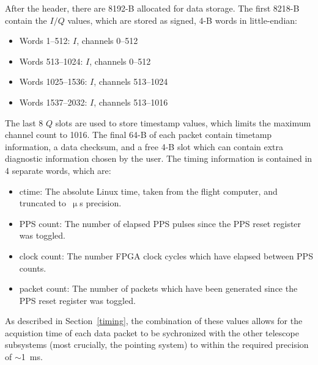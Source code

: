 After the header, there are 8192-B allocated for data storage. The first 8218-B contain the $I/Q$ values, which are stored as signed, 4-B words in little-endian:

\begin{itemize}[nosep]
  \item Words 1--512: $I$, channels 0--512
  \item Words 513--1024: $I$, channels 0--512
  \item Words 1025--1536: $I$, channels 513--1024
  \item Words 1537--2032: $I$, channels 513--1016
\end{itemize}

\vspace{5mm}

The last 8 $Q$ slots are used to store timestamp values, which limits the maximum channel count to 1016. The final 64-B of each packet contain timetamp information, a data checksum, and a free 4-B slot which can contain extra diagnostic information chosen by the user. The timing information is contained in 4 separate words, which are:

\begin{itemize}[nosep]
  \item ctime: The absolute Linux time, taken from the flight computer, and truncated to~$\upmu$s precision.
  \item PPS count: The number of elapsed PPS pulses since the PPS reset register was toggled.
  \item clock count: The number FPGA clock cycles which have elapsed between PPS counts.
  \item packet count: The number of packets which have been generated since the PPS reset register was toggled.
\end{itemize}

\vspace{5mm}

As described in Section~\ref{timing}, the combination of these values allows for the acquistion time of each data packet to be sychronized with the other telescope subsystems (most crucially, the pointing system) to within the required precision of $\sim$1~ms.

